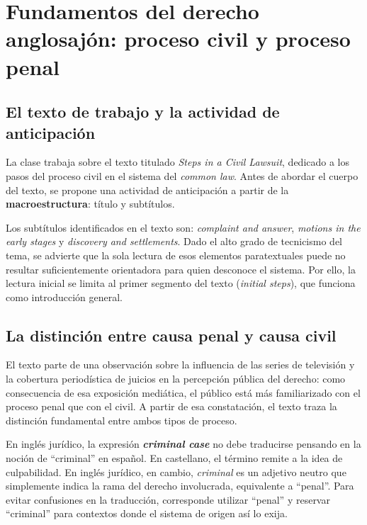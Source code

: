 \documentclass[12pt,oneside]{book}
\begin{document}
\tableofcontents

\mainmatter

\chapter{Fundamentos del derecho anglosajón: proceso civil y proceso penal}

\section{El texto de trabajo y la actividad de anticipación}

La clase trabaja sobre el texto titulado \textit{Steps in a Civil Lawsuit}, dedicado a los pasos del proceso civil en el sistema del \textit{common law}. Antes de abordar el cuerpo del texto, se propone una actividad de anticipación a partir de la \textbf{macroestructura}: título y subtítulos.

Los subtítulos identificados en el texto son: \textit{complaint and answer}, \textit{motions in the early stages} y \textit{discovery and settlements}. Dado el alto grado de tecnicismo del tema, se advierte que la sola lectura de esos elementos paratextuales puede no resultar suficientemente orientadora para quien desconoce el sistema. Por ello, la lectura inicial se limita al primer segmento del texto (\textit{initial steps}), que funciona como introducción general.

\section{La distinción entre causa penal y causa civil}

El texto parte de una observación sobre la influencia de las series de televisión y la cobertura periodística de juicios en la percepción pública del derecho: como consecuencia de esa exposición mediática, el público está más familiarizado con el proceso penal que con el civil. A partir de esa constatación, el texto traza la distinción fundamental entre ambos tipos de proceso.

\begin{important}
En inglés jurídico, la expresión \textbf{\textit{criminal case}} no debe traducirse pensando en la noción de ``criminal'' en español. En castellano, el término remite a la idea de culpabilidad. En inglés jurídico, en cambio, \textit{criminal} es un adjetivo neutro que simplemente indica la rama del derecho involucrada, equivalente a ``penal''. Para evitar confusiones en la traducción, corresponde utilizar ``penal'' y reservar ``criminal'' para contextos donde el sistema de origen así lo exija.
\end{important}
\end{document}
